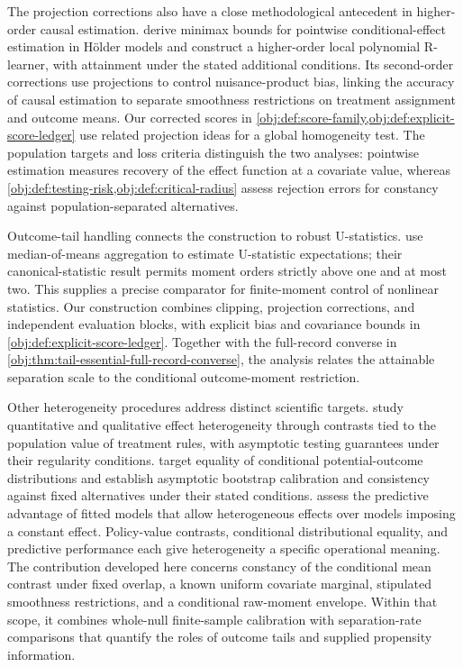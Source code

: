 \documentclass[11pt]{article}
\begin{document}
The projection corrections also have a close methodological antecedent in higher-order causal estimation. \citet[Sections 3--4]{KennedyBalakrishnanRobinsWasserman2024MinimaxCATE} derive minimax bounds for pointwise conditional-effect estimation in Hölder models and construct a higher-order local polynomial R-learner, with attainment under the stated additional conditions. Its second-order corrections use projections to control nuisance-product bias, linking the accuracy of causal estimation to separate smoothness restrictions on treatment assignment and outcome means. Our corrected scores in \cref{obj:def:score-family,obj:def:explicit-score-ledger} use related projection ideas for a global homogeneity test. The population targets and loss criteria distinguish the two analyses: pointwise estimation measures recovery of the effect function at a covariate value, whereas \cref{obj:def:testing-risk,obj:def:critical-radius} assess rejection errors for constancy against population-separated alternatives.

Outcome-tail handling connects the construction to robust U-statistics. \citet[Section 2 and Theorem 3]{JolyLugosi2016RobustU} use median-of-means aggregation to estimate U-statistic expectations; their canonical-statistic result permits moment orders strictly above one and at most two. This supplies a precise comparator for finite-moment control of nonlinear statistics. Our construction combines clipping, projection corrections, and independent evaluation blocks, with explicit bias and covariance bounds in \cref{obj:def:explicit-score-ledger}. Together with the full-record converse in \cref{obj:thm:tail-essential-full-record-converse}, the analysis relates the attainable separation scale to the conditional outcome-moment restriction.

Other heterogeneity procedures address distinct scientific targets. \citet[Sections 2--4]{DukesStensrudBrioschiHudson2026Homogeneity} study quantitative and qualitative effect heterogeneity through contrasts tied to the population value of treatment rules, with asymptotic testing guarantees under their regularity conditions. \citet[Sections 2--3 and Theorem 3.3]{JainLuedtke2026Distributional} target equality of conditional potential-outcome distributions and establish asymptotic bootstrap calibration and consistency against fixed alternatives under their stated conditions. \citet[Sections 2--3]{AshouriHenderson2026Predictive} assess the predictive advantage of fitted models that allow heterogeneous effects over models imposing a constant effect. Policy-value contrasts, conditional distributional equality, and predictive performance each give heterogeneity a specific operational meaning. The contribution developed here concerns constancy of the conditional mean contrast under fixed overlap, a known uniform covariate marginal, stipulated smoothness restrictions, and a conditional raw-moment envelope. Within that scope, it combines whole-null finite-sample calibration with separation-rate comparisons that quantify the roles of outcome tails and supplied propensity information.
\end{document}
